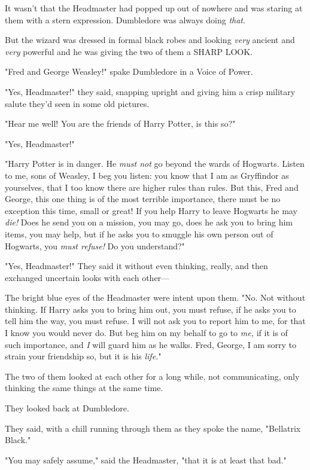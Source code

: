 It wasn't that the Headmaster had popped up out of nowhere and was staring at 
them with a stern expression. Dumbledore was always doing \emph{that}.

But the wizard was dressed in formal black robes and looking \emph{very} 
ancient and \emph{very} powerful and he was giving the two of them a SHARP LOOK.

"Fred and George Weasley!" spake Dumbledore in a Voice of Power.

"Yes, Headmaster!" they said, snapping upright and giving him a crisp military 
salute they'd seen in some old pictures.

"Hear me well! You are the friends of Harry Potter, is this so?"

"Yes, Headmaster!"

"Harry Potter is in danger. He \emph{must not} go beyond the wards of Hogwarts. 
Listen to me, sons of Weasley, I beg you listen: you know that I am as 
Gryffindor as yourselves, that I too know there are higher rules than rules. 
But this, Fred and George, this one thing is of the most terrible importance, 
there must be no exception this time, small or great! If you help Harry to 
leave Hogwarts he may \emph{die!} Does he send you on a mission, you may go, 
does he ask you to bring him items, you may help, but if he asks you to smuggle 
his own person out of Hogwarts, you \emph{must refuse!} Do you understand?"

"Yes, Headmaster!" They said it without even thinking, really, and then 
exchanged uncertain looks with each other---

The bright blue eyes of the Headmaster were intent upon them. "No. Not without 
thinking. If Harry asks you to bring him out, you must refuse, if he asks you 
to tell him the way, you must refuse. I will not ask you to report him to me, 
for that I know you would never do. But beg him on my behalf to go to 
\emph{me,} if it is of such importance, and \emph{I} will guard him as he 
walks. Fred, George, I am sorry to strain your friendship so, but it is his 
\emph{life.}"

The two of them looked at each other for a long while, not communicating, only 
thinking the same things at the same time.

They looked back at Dumbledore.

They said, with a chill running through them as they spoke the name, "Bellatrix 
Black."

"You may safely assume," said the Headmaster, "that it is at least that bad."

